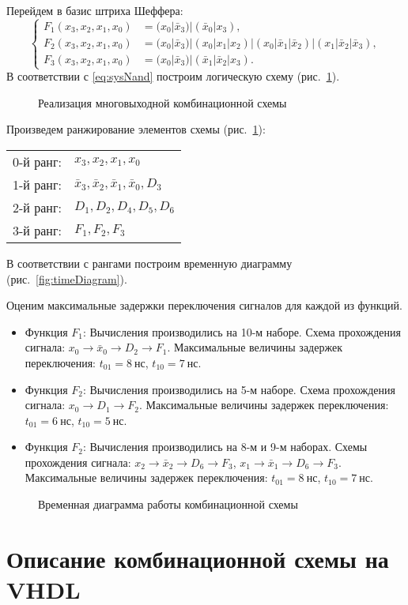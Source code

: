 Перейдем в базис штриха Шеффера:
\begin{equation} \label{eq:sysNand}
	\left\{
	\begin{aligned}
		F_1(x_3, x_2, x_1, x_0) &= (x_0 | \bar x_3) | (\bar x_0 | x_3),\\
		F_2(x_3, x_2, x_1, x_0) &= (x_0 | \bar x_3) |(x_0 | x_1 | x_2) | (x_0 | \bar x_1 | \bar x_2) | (x_1 | \bar x_2 | \bar x_3),\\
		F_3(x_3, x_2, x_1, x_0) &= (x_0 | \bar x_3) | (\bar x_1 | \bar x_2 | x_3).
	\end{aligned}
	\right.
\end{equation}
В соответствии с \eqref{eq:sysNand} построим логическую схему (рис.~\ref{fig:circuit}).
\begin{figure}[h!]
	\centering\rectangle{15cm}{19.5cm}
	\caption{Реализация многовыходной комбинационной схемы} \label{fig:circuit}
\end{figure}

Произведем ранжирование элементов схемы (рис.~\ref{fig:circuit}):
\begin{center}
\begin{tabular}{ll}
	0-й ранг: & $x_3, x_2, x_1, x_0$ \\
	1-й ранг: & $\bar x_3, \bar x_2, \bar x_1, \bar x_0, D_3$ \\
	2-й ранг: & $D_1, D_2, D_4, D_5, D_6$ \\
	3-й ранг: & $F_1, F_2, F_3$ \\
\end{tabular}
\end{center}
В соответствии с рангами построим временную диаграмму (рис.~\ref{fig:timeDiagram}).

Оценим максимальные задержки переключения сигналов для каждой из функций.
\begin{itemize}[noitemsep,topsep=0pt]
	\item Функция $F_1$:
	Вычисления производились на 10-м наборе. Схема прохождения сигнала: $x_0 \rightarrow \bar x_0 \rightarrow D_2 \rightarrow F_1$. Максимальные величины задержек переключения: $t_{01} = 8~нс$, $t_{10} = 7~нс$. 
	
	\item Функция $F_2$:
	Вычисления производились на 5-м наборе. Схема прохождения сигнала: $x_0  \rightarrow D_1 \rightarrow F_2$. Максимальные величины задержек переключения: $t_{01} = 6~нс$, $t_{10} = 5~нс$.
	
	\item Функция $F_2$:
	Вычисления производились на 8-м и 9-м наборах. Схемы прохождения сигнала: $x_2 \rightarrow \bar x_2 \rightarrow D_6 \rightarrow F_3$, $x_1 \rightarrow \bar x_1 \rightarrow D_6 \rightarrow F_3$. Максимальные величины задержек переключения: $t_{01} = 8~нс$, $t_{10} = 7~нс$.
\end{itemize}

\begin{figure}
	\rectangle{17cm}{22.5cm}
	\caption{Временная диаграмма работы комбинационной схемы}
\end{figure}

\section{Описание комбинационной схемы на VHDL}

